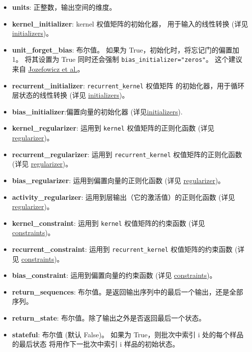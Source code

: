 \begin{itemize}
\tightlist
\item
  \textbf{units}: 正整数，输出空间的维度。
\item
  \textbf{kernel\_initializer}: kernel 权值矩阵的初始化器，
  用于输入的线性转换 (详见 \hyperref[initializers]{initializers})。
\item
  \textbf{unit\_forget\_bias}: 布尔值。 如果为
  True，初始化时，将忘记门的偏置加 1。 将其设置为 True 同时还会强制
  \texttt{bias\_initializer="zeros"}。 这个建议来自
  \href{http://www.jmlr.org/proceedings/papers/v37/jozefowicz15.pdf}{Jozefowicz
  et al.}。
\item
  \textbf{recurrent\_initializer}: \texttt{recurrent\_kernel} 权值矩阵
  的初始化器，用于循环层状态的线性转换 (详见
  \hyperref[initializers]{initializers})。
\item
  \textbf{bias\_initializer}:偏置向量的初始化器
  (详见\hyperref[initializers]{initializers}).
\item
  \textbf{kernel\_regularizer}: 运用到 \texttt{kernel}
  权值矩阵的正则化函数 (详见 \hyperref[regularizers]{regularizer})。
\item
  \textbf{recurrent\_regularizer}: 运用到 \texttt{recurrent\_kernel}
  权值矩阵的正则化函数 (详见 \hyperref[regularizers]{regularizer})。
\item
  \textbf{bias\_regularizer}: 运用到偏置向量的正则化函数 (详见
  \hyperref[regularizers]{regularizer})。
\item
  \textbf{activity\_regularizer}: 运用到层输出（它的激活值）的正则化函数
  (详见 \hyperref[regularizers]{regularizer})。
\item
  \textbf{kernel\_constraint}: 运用到 \texttt{kernel} 权值矩阵的约束函数
  (详见 \hyperref[constraints]{constraints})。
\item
  \textbf{recurrent\_constraint}: 运用到 \texttt{recurrent\_kernel}
  权值矩阵的约束函数 (详见 \hyperref[constraints]{constraints})。
\item
  \textbf{bias\_constraint}: 运用到偏置向量的约束函数 (详见
  \hyperref[constraints]{constraints})。
\item
  \textbf{return\_sequences}:
  布尔值。是返回输出序列中的最后一个输出，还是全部序列。
\item
  \textbf{return\_state}: 布尔值。除了输出之外是否返回最后一个状态。
\item
  \textbf{stateful}: 布尔值 (默认 False)。 如果为 True，则批次中索引 i
  处的每个样品的最后状态 将用作下一批次中索引 i 样品的初始状态。
\end{itemize}

\newpage
